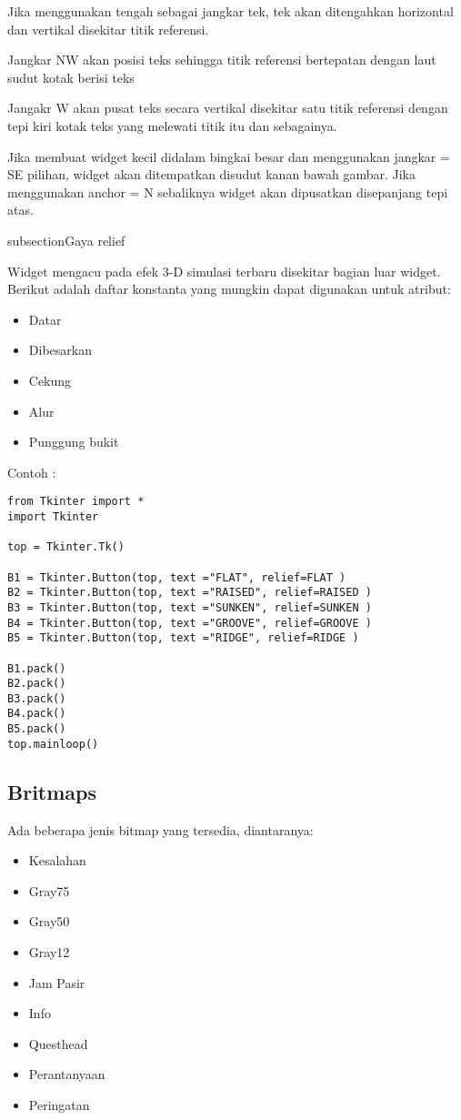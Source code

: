 \documentclass [12pt,a4paper,notitlepage,oneside,bahasa]{article}
\begin{document}
 \par
\vspace{12pt}
Jika menggunakan tengah sebagai jangkar tek, tek akan ditengahkan horizontal dan vertikal disekitar titik referensi. \par
Jangkar NW akan posisi teks sehingga titik referensi bertepatan dengan laut sudut kotak berisi teks \par
Jangakr W akan pusat teks secara vertikal disekitar satu titik referensi dengan tepi kiri kotak teks yang melewati titik itu dan sebagainya. \par
Jika membuat widget kecil didalam bingkai besar dan menggunakan jangkar = SE pilihan, widget akan ditempatkan disudut kanan bawah gambar. Jika menggunakan anchor = N sebaliknya widget akan dipusatkan disepanjang tepi atas. \par
\noindent 

subsection{Gaya relief}

Widget mengacu pada efek 3-D simulasi terbaru disekitar bagian luar widget. Berikut adalah daftar konstanta yang mungkin dapat digunakan untuk atribut:
\begin{itemize}
	\item Datar
	\item Dibesarkan
	\item Cekung
	\item Alur
	\item Punggung bukit
\end{itemize}


\vspace{12pt}
Contoh : \par
\begin{verbatim}
from Tkinter import *
import Tkinter

top = Tkinter.Tk()

B1 = Tkinter.Button(top, text ="FLAT", relief=FLAT )
B2 = Tkinter.Button(top, text ="RAISED", relief=RAISED )
B3 = Tkinter.Button(top, text ="SUNKEN", relief=SUNKEN )
B4 = Tkinter.Button(top, text ="GROOVE", relief=GROOVE )
B5 = Tkinter.Button(top, text ="RIDGE", relief=RIDGE )

B1.pack()
B2.pack()
B3.pack()
B4.pack()
B5.pack()
top.mainloop()
\end{verbatim}

\noindent 
\subsection{Britmaps}
\noindent 
Ada beberapa jenis bitmap yang tersedia, diantaranya: \par
\noindent 
\begin{itemize}
	\item Kesalahan
	\item Gray75 
	\item Gray50 
	\item Gray12
	\item Jam Pasir 
	\item Info 
	\item Questhead
	\item Perantanyaan
	\item Peringatan
\end{itemize}
\end{document}
